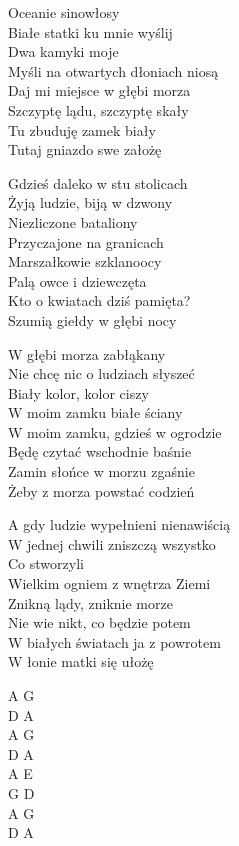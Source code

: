 \begin{text}
    Oceanie sinowłosy\\
    Białe statki ku mnie wyślij\\
    Dwa kamyki moje\\
    Myśli na otwartych dłoniach niosą\\
    Daj mi miejsce w głębi morza\\
    Szczyptę lądu, szczyptę skały\\
    Tu zbuduję zamek biały\\
    Tutaj gniazdo swe założę

    Gdzieś daleko w stu stolicach\\
    Żyją ludzie, biją w dzwony\\
    Niezliczone bataliony\\
    Przyczajone na granicach\\
    Marszałkowie szklanoocy\\
    Palą owce i dziewczęta\\
    Kto o kwiatach dziś pamięta?\\
    Szumią giełdy w głębi nocy

    W głębi morza zabłąkany\\
    Nie chcę nic o ludziach słyszeć\\
    Biały kolor, kolor ciszy\\
    W moim zamku białe ściany\\
    W moim zamku, gdzieś w ogrodzie\\
    Będę czytać wschodnie baśnie\\
    Zamin słońce w morzu zgaśnie\\
    Żeby z morza powstać codzień

    A gdy ludzie wypełnieni nienawiścią\\
    W jednej chwili zniszczą wszystko\\
    Co stworzyli\\
    Wielkim ogniem z wnętrza Ziemi\\
    Znikną lądy, zniknie morze\\
    Nie wie nikt, co będzie potem\\
    W białych światach ja z powrotem\\
    W łonie matki się ułożę
\end{text}
\begin{chord}
    A G\\
    D A\\
    A G\\
    D A\\
    A E\\
    G D\\
    A G\\
    D A
\end{chord}
